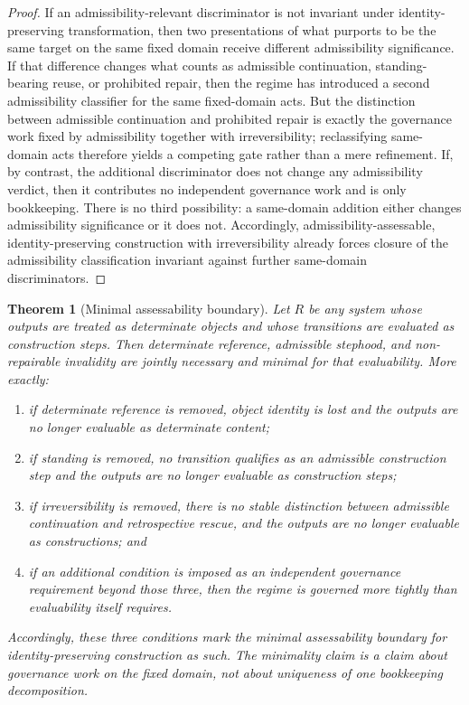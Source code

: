 \documentclass[11pt]{article}
\newtheorem{theorem}{Theorem}[section]
\theoremstyle{definition}
\theoremstyle{remark}
\begin{document}
\begin{proof}
If an admissibility-relevant discriminator is not invariant under identity-preserving transformation, then two presentations of what purports to be the same target on the same fixed domain receive different admissibility significance. If that difference changes what counts as admissible continuation, standing-bearing reuse, or prohibited repair, then the regime has introduced a second admissibility classifier for the same fixed-domain acts. But the distinction between admissible continuation and prohibited repair is exactly the governance work fixed by admissibility together with irreversibility; reclassifying same-domain acts therefore yields a competing gate rather than a mere refinement. If, by contrast, the additional discriminator does not change any admissibility verdict, then it contributes no independent governance work and is only bookkeeping. There is no third possibility: a same-domain addition either changes admissibility significance or it does not. Accordingly, admissibility-assessable, identity-preserving construction with irreversibility already forces closure of the admissibility classification invariant against further same-domain discriminators.
\end{proof}

\begin{theorem}[Minimal assessability boundary]\label{thm:minimal-assessability-boundary}
Let $R$ be any system whose outputs are treated as determinate objects and whose transitions are evaluated as construction steps. Then determinate reference, admissible stephood, and non-repairable invalidity are jointly necessary and minimal for that evaluability. More exactly:
\begin{enumerate}[label=(\roman*)]
    \item if determinate reference is removed, object identity is lost and the outputs are no longer evaluable as determinate content;
    \item if standing is removed, no transition qualifies as an admissible construction step and the outputs are no longer evaluable as construction steps;
    \item if irreversibility is removed, there is no stable distinction between admissible continuation and retrospective rescue, and the outputs are no longer evaluable as constructions; and
    \item if an additional condition is imposed as an independent governance requirement beyond those three, then the regime is governed more tightly than evaluability itself requires.
\end{enumerate}
Accordingly, these three conditions mark the minimal assessability boundary for identity-preserving construction as such. The minimality claim is a claim about governance work on the fixed domain, not about uniqueness of one bookkeeping decomposition.
\end{theorem}
\end{document}
